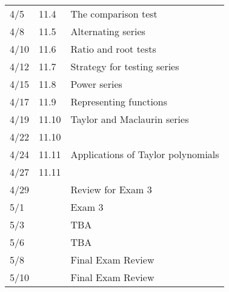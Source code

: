 \documentclass[10pt]{amsart}
\begin{document}
\begin{center}
\begin{tabular}{lll}
  4/5 & 11.4 & The comparison test\\
  4/8 & 11.5 & Alternating series\\ 
  4/10 & 11.6 & Ratio and root tests\\ 
  4/12 & 11.7 & Strategy for testing series\\
  4/15 & 11.8 & Power series\\
  4/17 & 11.9 & Representing functions\\
  4/19 & 11.10 & Taylor and Maclaurin series\\
  4/22 & 11.10\\
  4/24 & 11.11 & Applications of Taylor polynomials\\
  4/27 & 11.11 \\
  4/29 & & Review for Exam 3\\
  5/1  & & Exam 3\\
  \hline
  5/3 & & TBA\\
  5/6 & & TBA\\
  5/8 & & Final Exam Review\\
  5/10 & & Final Exam Review\\
\end{tabular}
\end{center}
\end{document}
